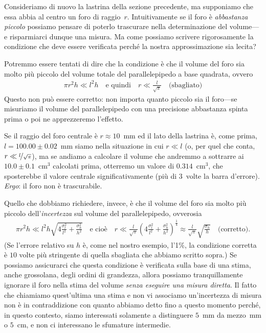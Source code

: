 Consideriamo di nuovo la lastrina della sezione precedente, ma supponiamo
che essa abbia al centro un foro di raggio~$r$. Intuitivamente se il foro è
\emph{abbastanza piccolo} possiamo pensare di poterlo trascurare nella
determinazione del volume---e risparmiarci dunque una misura. Ma come possiamo
scrivere rigorosamente la condizione che deve essere verificata perché la
nostra approssimazione sia lecita?

Potremmo essere tentati di dire che la condizione è che il volume del foro
sia molto più piccolo del volume totale del parallelepipedo a base
quadrata, ovvero
\begin{align}
  \pi r^2 h \ll l^2 h \quad \text{e quindi} \quad
  r \ll \frac{l}{\sqrt{\pi}} \quad \text{(sbagliato)}
\end{align}
Questo non può essere corretto: non importa quanto piccolo sia il foro---se
misuriamo il volume del parallelepipedo con una precisione abbastanza spinta
prima o poi ne apprezzeremo l'effetto.

\begin{examplebox}
  \begin{example}
    Se il raggio del foro centrale è $r \approx 10$~mm ed il lato della
    lastrina è, come prima, $l = 100.00 \pm 0.02$~mm siamo nella situazione
    in cui $r \ll l$ (o, per quel che conta, $r \ll \nicefrac{l}{\sqrt{\pi}}$),
    ma se andiamo a calcolare il volume che andremmo a sottrarre ai
    $10.0 \pm 0.1$~cm$^3$ calcolati prima, otterremo un valore di
    $0.314$~cm$^3$, che sposterebbe il valore centrale significativamente
    (più di $3$~volte la barra d'errore). \emph{Ergo}: il foro non è trascurabile.
  \end{example}
\end{examplebox}

Quello che dobbiamo richiedere, invece, è che il volume del foro sia molto
più piccolo dell'\emph{incertezza} sul volume del parallelepipedo, ovverosia
\begin{align}
  \pi r^2 h \ll l^2 h \sqrt{4\frac{\sigma^2_l}{l^2} + \frac{\sigma^2_h}{h^2}}
  \quad \text{e cioè} \quad
  r \ll \frac{l}{\sqrt{\pi}}
  \left( 4\frac{\sigma^2_l}{l^2} + \frac{\sigma^2_h}{h^2} \right)^\frac{1}{4}
  \approx \frac{l}{\sqrt{\pi}} \sqrt{\frac{\sigma_h}{h}}
  \quad \text{(corretto)}.
\end{align}
(Se l'errore relativo su $h$ è, come nel nostro esempio, l'1\%, la condizione
corretta è $10$ volte più stringente di quella sbagliata che abbiamo
scritto sopra.) Se possiamo assicurarci che questa condizione è verificata
sulla base di una stima, anche grossolana, degli ordini di grandezza, allora
possiamo tranquillamente ignorare il foro nella stima del volume
\emph{senza eseguire una misura diretta}. Il fatto che chiamiamo quest'ultima
una stima e non vi associamo un'incertezza di misura non è in contraddizione
con quanto abbiamo detto fino a questo momento perché, in questo contesto,
siamo interessati solamente a distinguere $5$~mm da mezzo~mm o $5$~cm, e non
ci interessano le sfumature intermedie.


